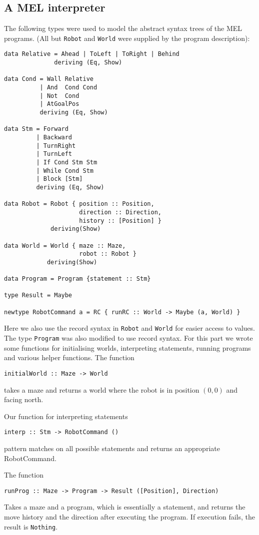 \documentclass[a4paper,10pt]{article}
\begin{document}
\subsection{A MEL interpreter}

The following types were used to model the abstract syntax trees of the MEL programs. (All but \verb=Robot= and \verb=World= were supplied by the program description):
\begin{verbatim}
data Relative = Ahead | ToLeft | ToRight | Behind
              deriving (Eq, Show)

data Cond = Wall Relative
          | And  Cond Cond
          | Not  Cond
          | AtGoalPos
          deriving (Eq, Show)
            
data Stm = Forward
         | Backward
         | TurnRight
         | TurnLeft    
         | If Cond Stm Stm
         | While Cond Stm
         | Block [Stm]
         deriving (Eq, Show)

data Robot = Robot { position :: Position,
                     direction :: Direction,
                     history :: [Position] }
             deriving(Show)
             
data World = World { maze :: Maze,
                     robot :: Robot }
            deriving(Show)

data Program = Program {statement :: Stm}

type Result = Maybe

newtype RobotCommand a = RC { runRC :: World -> Maybe (a, World) }
\end{verbatim}
Here we also use the record syntax in \verb=Robot= and \verb=World= for easier access to values. The type \verb=Program= was also modified to use record syntax.
For this part we wrote some functions for initialising worlds, interpreting statements, running programs and various helper functions. The function
\begin{verbatim}
initialWorld :: Maze -> World
\end{verbatim}
takes a maze and returns a world where the robot is in position $(0,0)$ and facing north. 

Our function for interpreting statements
\begin{verbatim}
interp :: Stm -> RobotCommand ()
\end{verbatim}
pattern matches on all possible statements and returns an appropriate RobotCommand.

The function 
\begin{verbatim}
runProg :: Maze -> Program -> Result ([Position], Direction)
\end{verbatim}
Takes a maze and a program, which is essentially a statement, and returns the move history and the direction after executing the program. If execution fails, the result is \verb=Nothing=.
\end{document}
